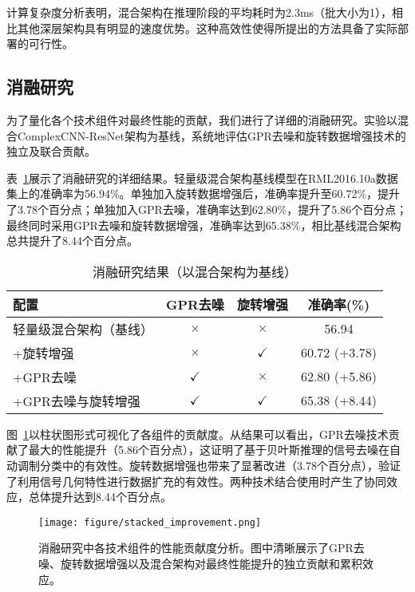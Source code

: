 \documentclass[conference]{IEEEtran}
\begin{document}
计算复杂度分析表明，混合架构在推理阶段的平均耗时为2.3ms（批大小为1），相比其他深层架构具有明显的速度优势。这种高效性使得所提出的方法具备了实际部署的可行性。

\subsection{消融研究}

为了量化各个技术组件对最终性能的贡献，我们进行了详细的消融研究。实验以混合ComplexCNN-ResNet架构为基线，系统地评估GPR去噪和旋转数据增强技术的独立及联合贡献。

表~\ref{tab:ablation_study}展示了消融研究的详细结果。轻量级混合架构基线模型在RML2016.10a数据集上的准确率为56.94\%。单独加入旋转数据增强后，准确率提升至60.72\%，提升了3.78个百分点；单独加入GPR去噪，准确率达到62.80\%，提升了5.86个百分点；最终同时采用GPR去噪和旋转数据增强，准确率达到65.38\%，相比基线混合架构总共提升了8.44个百分点。

\begin{table}[h]
\centering
\caption{消融研究结果（以混合架构为基线）}
\label{tab:ablation_study}
\begin{tabular}{@{}lccc@{}}
\toprule
配置 & GPR去噪 & 旋转增强 & 准确率(\%) \\
\midrule
轻量级混合架构（基线） & $\times$ & $\times$ & 56.94 \\
+旋转增强 & $\times$ & $\checkmark$ & 60.72 (+3.78) \\
+GPR去噪 & $\checkmark$ & $\times$ & 62.80 (+5.86) \\
+GPR去噪与旋转增强 & $\checkmark$ & $\checkmark$ & 65.38 (+8.44) \\
\bottomrule
\end{tabular}
\end{table}

图~\ref{fig:ablation_components}以柱状图形式可视化了各组件的贡献度。从结果可以看出，GPR去噪技术贡献了最大的性能提升（5.86个百分点），这证明了基于贝叶斯推理的信号去噪在自动调制分类中的有效性。旋转数据增强也带来了显著改进（3.78个百分点），验证了利用信号几何特性进行数据扩充的有效性。两种技术结合使用时产生了协同效应，总体提升达到8.44个百分点。

\begin{figure}[htbp]
\centering
\texttt{[image: figure/stacked\_improvement.png]}
\caption{消融研究中各技术组件的性能贡献度分析。图中清晰展示了GPR去噪、旋转数据增强以及混合架构对最终性能提升的独立贡献和累积效应。}
\label{fig:ablation_components}
\end{figure}
\end{document}
